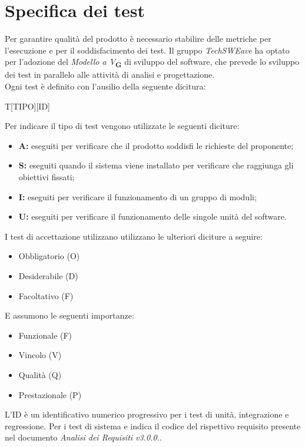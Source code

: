 \section{Specifica dei test}
Per garantire qualità del prodotto è necessario stabilire delle metriche per l’esecuzione e per il soddisfacimento dei test.
Il gruppo \textit{TechSWEave} ha optato per l'adozione del \textit{Modello a V}\textsubscript{\textbf{G}} di sviluppo del software, che
prevede lo sviluppo dei test in parallelo alle attività di analisi e progettazione.\\
Ogni test è definito con l'ausilio della seguente dicitura:\\
\begin{center}
    T[TIPO][ID]
\end{center}
Per indicare il tipo di test vengono utilizzate le seguenti diciture:
\begin{itemize}
    \item \textbf{A:} eseguiti per verificare che il prodotto soddisfi le richieste del proponente;
    \item \textbf{S:} eseguiti quando il sistema viene installato per verificare che raggiunga gli obiettivi fissati;
    \item \textbf{I:} eseguiti per verificare il funzionamento di un gruppo di moduli;
    \item \textbf{U:} eseguiti per verificare il funzionamento delle singole unità del software.
\end{itemize}
I test di accettazione utilizzano utilizzano le ulteriori diciture a seguire:
\begin{itemize}
    \item Obbligatorio (O)
    \item Desiderabile (D)
    \item Facoltativo (F)
\end{itemize}
E assumono le seguenti importanze:
\begin{itemize}
    \item Funzionale (F)
    \item Vincolo (V)
    \item Qualità (Q)
    \item Prestazionale (P)
\end{itemize}
L'ID è un identificativo numerico progressivo per i test di unità, integrazione e regressione. Per i test di sistema e 
indica il codice del rispettivo requisito presente nel documento \textit{Analisi dei Requisiti v3.0.0.}.\\
